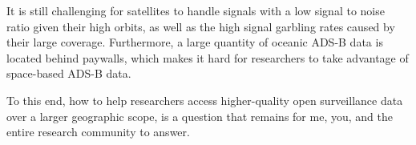 It is still challenging for satellites to handle signals with a low signal to noise ratio given their high orbits, as well as the high signal garbling rates caused by their large coverage. Furthermore, a large quantity of oceanic ADS-B data is located behind paywalls, which makes it hard for researchers to take advantage of space-based ADS-B data. 

To this end, how to help researchers access higher-quality open surveillance data over a larger geographic scope, is a question that remains for me, you, and the entire research community to answer.